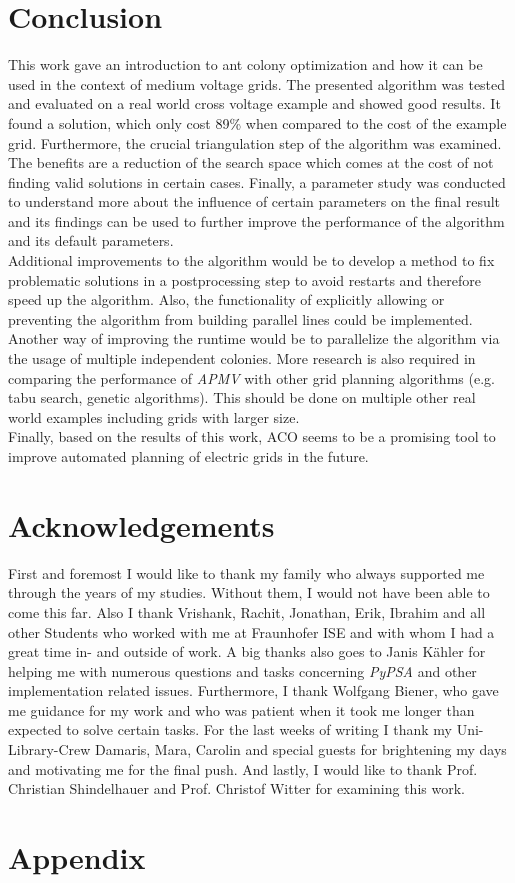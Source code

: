 \chapter{Conclusion}\label{chap:conclusion}
This work gave an introduction to ant colony optimization and how it can be used in the context of medium voltage grids. The presented algorithm was tested and evaluated on a real world cross voltage example and showed good results. It found a solution, which only cost 89\% when compared to the cost of the example grid. Furthermore, the crucial triangulation step of the algorithm was examined. The benefits are a reduction of the search space which comes at the cost of not finding valid solutions in certain cases. Finally, a parameter study was conducted to understand more about the influence of certain parameters on the final result and its findings can be used to further improve the performance of the algorithm and its default parameters. \\
Additional improvements to the algorithm would be to develop a method to fix problematic solutions in a postprocessing step to avoid restarts and therefore speed up the algorithm. Also, the functionality of explicitly allowing or preventing the algorithm from building parallel lines could be implemented. Another way of improving the runtime would be to parallelize the algorithm via the usage of multiple independent colonies. More research is also required in comparing the performance of \textit{APMV} with other grid planning algorithms (e.g. tabu search, genetic algorithms). This should be done on multiple other real world examples including grids with larger size. \\
Finally, based on the results of this work, ACO seems to be a promising tool to improve automated planning of electric grids in the future. 


\chapter*{Acknowledgements}
\thispagestyle{empty}

First and foremost I would like to thank my family who always supported me through the years of my studies. Without them, I would not have been able to come this far. Also I thank Vrishank, Rachit, Jonathan, Erik, Ibrahim and all other Students who worked with me at Fraunhofer ISE and with whom I had a great time in- and outside of work. A big thanks also goes to Janis Kähler for helping me with numerous questions and tasks concerning \textit{PyPSA} and other implementation related issues. Furthermore, I thank Wolfgang Biener, who gave me guidance for my work and who was patient when it took me longer than expected to solve certain tasks. For the last weeks of writing I thank my Uni-Library-Crew Damaris, Mara, Carolin and special guests for brightening my days and motivating me for the final push. And lastly, I would like to thank Prof. Christian Shindelhauer and Prof. Christof Witter for examining this work.



\clearpage



\appendix
\chapter{Appendix}


